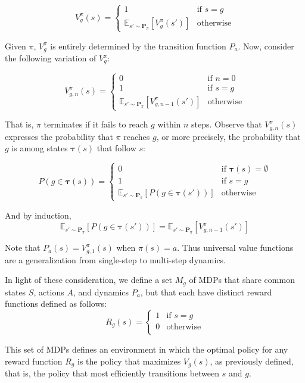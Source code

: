 \documentclass{article}
\begin{document}
\[ 
V_{g}^\pi(s) = 
  \begin{cases}
    1 & \text{if } s = g \\ 
    \mathbb{E}_{s' \sim \bm{P}_{\pi}}\left [ V_{g}^\pi(s') \right ] & \text{otherwise}
  \end{cases}
\]

Given $\pi$, $V_{g}^\pi$ is entirely determined by the transition function $P_a$. Now, consider the following variation of $V_g^\pi$:

\[
V_{g, n}^\pi(s) = 
	\begin{cases}
		0 & \text{if } n = 0 \\ 
		1 & \text{if } s = g \\ 
		\mathbb{E}_{s' \sim \bm{P}_{\pi}}\left [ V_{g, n-1}^\pi(s') \right ] & \text{otherwise}
	\end{cases}
\]

That is, $\pi$ terminates if it fails to reach $g$ within $n$ steps. Observe that $V_{g, n}^\pi(s)$ expresses the probability that $\pi$ reaches $g$, or more precisely, the probability that $g$ is among states $\bm{\tau}(s)$ that follow $s$:

\[ 
P\left(g \in \bm{\tau}(s)\right) =
\begin{cases}
    0 & \text{if } \bm{\tau}(s) = \emptyset \\ 
    1 & \text{if } s = g \\ 
    \mathbb{E}_{s' \sim \bm{P}_{\pi}}\left[ P \left( g \in \bm{\tau}(s') \right) \right] & \text{otherwise}
\end{cases}
\]

And by induction, 
\[
\mathbb{E}_{s' \sim \bm{P}_{\pi}}\left[ P \left( g \in \bm{\tau}(s') \right) \right] = \mathbb{E}_{s' \sim \bm{P}_{\pi}}\left[ V_{g, n-1}^\pi(s') \right]
\]

Note that $P_a(s) = V_{g, 1}^\pi(s)$ when $\pi(s) = a$. Thus universal value functions are a generalization from single-step to multi-step dynamics.

In light of these consideration, we define a set $M_{g}$ of MDPs that share common states $S$, actions $A$, and dynamics $P_a$, but that each have distinct reward functions defined as follows:
\[
  R_{g}(s) = 
  \begin{cases}
    1 & \text{if } s = g \\ 
    0 & \text{otherwise} \\ 
  \end{cases}
\]

This set of MDPs defines an environment in which the optimal policy for any reward function $R_{g}$ is the policy that maximizes $V_g(s)$, as previously defined, that is, the policy that most efficiently transitions between $s$ and $g$.
\end{document}
